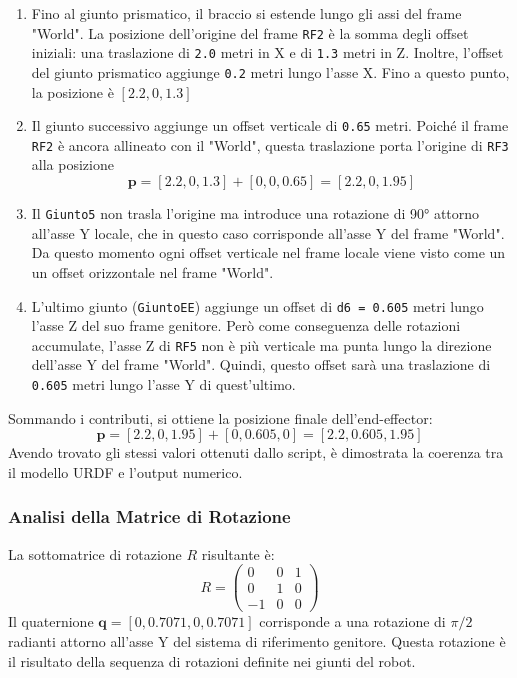 \documentclass[11pt, a4paper]{report}
\begin{document}
\begin{enumerate}
    \item Fino al giunto prismatico, il braccio si estende lungo gli assi del frame "World". La posizione dell'origine del frame \texttt{RF2} è la somma degli offset iniziali: una traslazione di \texttt{2.0} metri in X e di \texttt{1.3} metri in Z. Inoltre, l'offset del giunto prismatico aggiunge \texttt{0.2} metri lungo l'asse X. Fino a questo punto, la posizione è \([2.2, 0, 1.3]\)

    \item Il giunto successivo aggiunge un offset verticale di \texttt{0.65} metri. Poiché il frame \texttt{RF2} è ancora allineato con il "World", questa traslazione porta l'origine di \texttt{RF3}  alla posizione
    \[
        \textbf{p} = [2.2, 0, 1.3] + [0, 0, 0.65] = [2.2, 0, 1.95]
    \]

    \item Il \texttt{Giunto5} non trasla l'origine ma introduce una rotazione di 90° attorno all'asse Y locale, che in questo caso corrisponde all'asse Y del frame "World". Da questo momento ogni offset verticale nel frame locale viene visto come un un offset orizzontale nel frame "World".

    \item L'ultimo giunto (\texttt{GiuntoEE}) aggiunge un offset di \texttt{d6 = 0.605} metri lungo l'asse Z del suo frame genitore. Però come conseguenza delle rotazioni accumulate, l'asse Z di \texttt{RF5} non è più verticale ma punta lungo la direzione dell'asse Y del frame "World". Quindi, questo offset sarà una traslazione di \texttt{0.605} metri lungo l'asse Y di quest'ultimo.
\end{enumerate}

Sommando i contributi, si ottiene la posizione finale dell'end-effector:
\[
    \textbf{p} = [2.2, 0, 1.95] + [0, 0.605, 0] = [2.2, 0.605, 1.95]
\]
Avendo trovato gli stessi valori ottenuti dallo script, è dimostrata la coerenza tra il modello URDF e l'output numerico.

\subsubsection{Analisi della Matrice di Rotazione}
La sottomatrice di rotazione \(R\) risultante è:
\[
    R =
    \begin{pmatrix}
        0 & 0 & 1 \\
        0 & 1 & 0 \\
       -1 & 0 & 0
    \end{pmatrix}
\]
Il quaternione \(\mathbf{q} = [0, 0.7071, 0, 0.7071]\) corrisponde a una rotazione di \(\pi/2\) radianti attorno all'asse Y del sistema di riferimento genitore. Questa rotazione è il risultato della sequenza di rotazioni definite nei giunti del robot.
\end{document}
